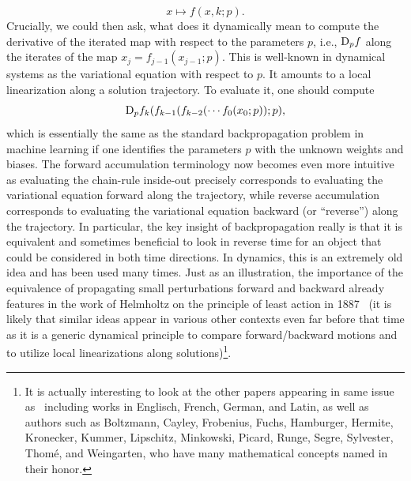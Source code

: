 \documentclass[10pt]{article}
\def\txtD{{\textnormal{D}}}
\newcommand{\benn}{\begin{equation*}}
\newcommand{\eenn}{\end{equation*}}
\begin{document}
\benn
x\mapsto f(x,k;p).
\eenn 
Crucially, we could then ask, what does it dynamically mean to compute the derivative of the iterated map with respect to the parameters $p$, i.e., $\txtD_pf$ along the iterates of the map $x_j=f_{j-1}(x_{j-1};p)$. This is well-known in dynamical systems as the variational equation with respect to $p$. It amounts to a local linearization along a solution trajectory. To evaluate it, one should compute
\benn
\txtD_p f_k( f_{k-1}(f_{k-2}( \cdots f_0(x_0;p) );p),
\eenn  
which is essentially the same as the standard backpropagation problem in machine learning if one identifies the parameters $p$ with the unknown weights and biases. The forward accumulation terminology now becomes even more intuitive as evaluating the chain-rule inside-out precisely corresponds to evaluating the variational equation forward along the trajectory, while reverse accumulation corresponds to evaluating the variational equation backward (or ``reverse'') along the trajectory. In particular, the key insight of backpropagation really is that it is equivalent and sometimes beneficial to look in reverse time for an object that could be considered in both time directions. In dynamics, this is an extremely old idea and has been used many times. Just as an illustration, the importance of the equivalence of propagating small perturbations forward and backward already features in the work of Helmholtz on the principle of least action in 1887~\cite{Helmholtz} (it is likely that similar ideas appear in various other contexts even far before that time as it is a generic dynamical principle to compare forward/backward motions and to utilize local linearizations along solutions)\footnote{It is actually interesting to look at the other papers appearing in same issue as~\cite{Helmholtz} including works in Englisch, French, German, and Latin, as well as authors such as Boltzmann, Cayley, Frobenius, Fuchs, Hamburger, Hermite, Kronecker, Kummer, Lipschitz, Minkowski, Picard, Runge, Segre, Sylvester, Thom\'e, and Weingarten, who have many mathematical concepts named in their honor.}.
\end{document}
